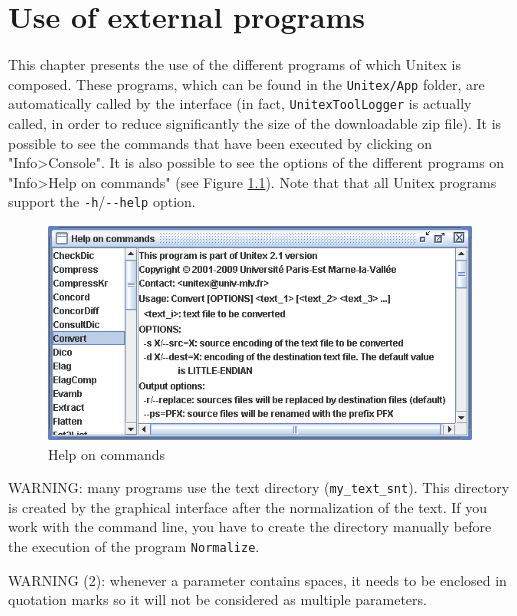 


\chapter{Use of external programs}
\label{chap-external-programs}
This chapter presents the use of the different programs of which Unitex is
composed. These programs, which can be found in the \verb+Unitex/App+ folder, are
automatically called by the interface (in fact, \verb+UnitexToolLogger+ is
actually called, in order to reduce significantly the size of the downloadable
zip file). It is possible to see the commands that have been executed by
clicking on "Info>Console". It is also possible to see the options of the different programs on "Info>Help on commands" (see Figure \ref{fig-help}). Note that that all Unitex
programs support the \verb$-h$/\verb$--help$ option.

\bigskip
\begin{figure}[!h]
\begin{center}
\includegraphics[width=14cm]{resources/img/fig11-1.png}
\caption{Help on commands\label{fig-help}}
\end{center}
\end{figure}

\bigskip
\noindent WARNING: many programs use the text directory
(\verb+my_text_snt+). This directory is created by the graphical interface after
the normalization of the text. If you work with the command line, you have to
create the directory manually before the execution of the program
\verb+Normalize+.

\bigskip
\noindent WARNING (2): whenever a parameter contains spaces, it needs to
be enclosed in quotation marks so it will not be considered as multiple
parameters.

